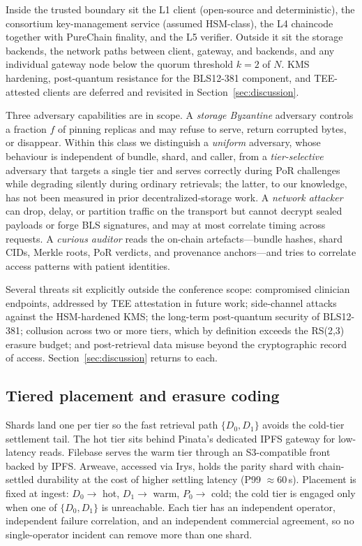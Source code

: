 Inside the trusted boundary sit the L1 client (open-source and deterministic), the consortium key-management service (assumed HSM-class), the L4 chaincode together with PureChain finality, and the L5 verifier. Outside it sit the storage backends, the network paths between client, gateway, and backends, and any individual gateway node below the quorum threshold $k=2$ of $N$. KMS hardening, post-quantum resistance for the BLS12-381 component, and TEE-attested clients are deferred and revisited in Section~\ref{sec:discussion}.

Three adversary capabilities are in scope. A \emph{storage Byzantine} adversary controls a fraction $f$ of pinning replicas and may refuse to serve, return corrupted bytes, or disappear. Within this class we distinguish a \emph{uniform} adversary, whose behaviour is independent of bundle, shard, and caller, from a \emph{tier-selective} adversary that targets a single tier and serves correctly during PoR challenges while degrading silently during ordinary retrievals; the latter, to our knowledge, has not been measured in prior decentralized-storage work. A \emph{network attacker} can drop, delay, or partition traffic on the transport but cannot decrypt sealed payloads or forge BLS signatures, and may at most correlate timing across requests. A \emph{curious auditor} reads the on-chain artefacts---bundle hashes, shard CIDs, Merkle roots, PoR verdicts, and provenance anchors---and tries to correlate access patterns with patient identities.

Several threats sit explicitly outside the conference scope: compromised clinician endpoints, addressed by TEE attestation in future work; side-channel attacks against the HSM-hardened KMS; the long-term post-quantum security of BLS12-381; collusion across two or more tiers, which by definition exceeds the RS(2,3) erasure budget; and post-retrieval data misuse beyond the cryptographic record of access. Section~\ref{sec:discussion} returns to each.

\subsection{Tiered placement and erasure coding}
\label{sec:method:placement}

Shards land one per tier so the fast retrieval path $\{D_0, D_1\}$ avoids the cold-tier settlement tail. The hot tier sits behind Pinata's dedicated IPFS gateway for low-latency reads. Filebase serves the warm tier through an S3-compatible front backed by IPFS. Arweave, accessed via Irys, holds the parity shard with chain-settled durability at the cost of higher settling latency (P99 $\approx 60$\,s). Placement is fixed at ingest: $D_0 \to$ hot, $D_1 \to$ warm, $P_0 \to$ cold; the cold tier is engaged only when one of $\{D_0, D_1\}$ is unreachable. Each tier has an independent operator, independent failure correlation, and an independent commercial agreement, so no single-operator incident can remove more than one shard.

